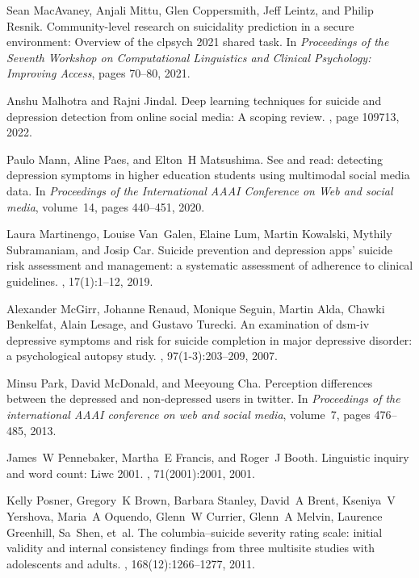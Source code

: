 \begin{thebibliography}{10}
Sean MacAvaney, Anjali Mittu, Glen Coppersmith, Jeff Leintz, and Philip Resnik.
\newblock Community-level research on suicidality prediction in a secure
  environment: Overview of the clpsych 2021 shared task.
\newblock In {\em Proceedings of the Seventh Workshop on Computational
  Linguistics and Clinical Psychology: Improving Access}, pages 70--80, 2021.

Anshu Malhotra and Rajni Jindal.
\newblock Deep learning techniques for suicide and depression detection from
  online social media: A scoping review.
, page 109713, 2022.

Paulo Mann, Aline Paes, and Elton~H Matsushima.
\newblock See and read: detecting depression symptoms in higher education
  students using multimodal social media data.
\newblock In {\em Proceedings of the International AAAI Conference on Web and
  social media}, volume~14, pages 440--451, 2020.

Laura Martinengo, Louise Van~Galen, Elaine Lum, Martin Kowalski, Mythily
  Subramaniam, and Josip Car.
\newblock Suicide prevention and depression apps’ suicide risk assessment and
  management: a systematic assessment of adherence to clinical guidelines.
, 17(1):1--12, 2019.

Alexander McGirr, Johanne Renaud, Monique Seguin, Martin Alda, Chawki
  Benkelfat, Alain Lesage, and Gustavo Turecki.
\newblock An examination of dsm-iv depressive symptoms and risk for suicide
  completion in major depressive disorder: a psychological autopsy study.
, 97(1-3):203--209, 2007.

Minsu Park, David McDonald, and Meeyoung Cha.
\newblock Perception differences between the depressed and non-depressed users
  in twitter.
\newblock In {\em Proceedings of the international AAAI conference on web and
  social media}, volume~7, pages 476--485, 2013.

James~W Pennebaker, Martha~E Francis, and Roger~J Booth.
\newblock Linguistic inquiry and word count: Liwc 2001.
, 71(2001):2001, 2001.

Kelly Posner, Gregory~K Brown, Barbara Stanley, David~A Brent, Kseniya~V
  Yershova, Maria~A Oquendo, Glenn~W Currier, Glenn~A Melvin, Laurence
  Greenhill, Sa~Shen, et~al.
\newblock The columbia--suicide severity rating scale: initial validity and
  internal consistency findings from three multisite studies with adolescents
  and adults.
, 168(12):1266--1277, 2011.


\end{thebibliography}
